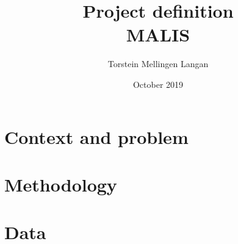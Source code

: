 \documentclass{article}
\title{Project definition\\MALIS}
\author{Torstein Mellingen Langan}
\date{October 2019}
\begin{document}
\maketitle

\section*{Context and problem}
\label{sec:context_and_problem}


\section*{Methodology}
\label{sec:methodology}


\section*{Data}
\label{sec:data}

\end{document}
